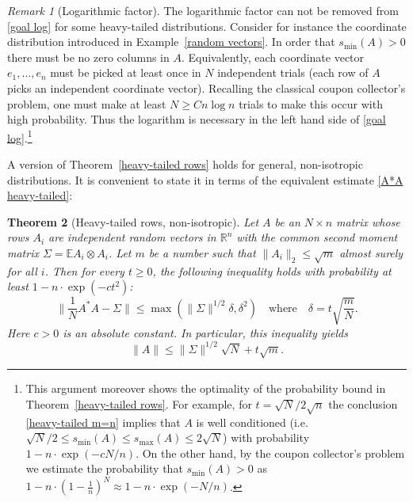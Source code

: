 \documentclass[10pt, openany]{book}
\newtheorem{theorem}{Theorem}[chapter]
\theoremstyle{remark}
\newtheorem{remark}[theorem]{Remark}
\def \R {\mathbb{R}}
\def \E {\mathbb{E}}
\def \d {\delta}
\def \smin {s_{\min}}
\def \smax {s_{\max}}
\begin{document}
\begin{remark}[Logarithmic factor] 
  The logarithmic factor can not be removed from \eqref{goal log} for some heavy-tailed distributions.
  Consider for instance the coordinate distribution introduced in Example~\ref{random vectors}. 
  In order that $\smin(A) > 0$ there must be no zero columns in $A$. Equivalently, each coordinate vector
  $e_1, \ldots,e_n$  must be picked at least once in $N$ independent trials 
  (each row of $A$ picks an independent coordinate vector). 
  Recalling the classical coupon collector's problem, one must make at least $N \ge C n \log n$ trials to make this occur
  with high probability. Thus the logarithm is necessary in the left hand side of \eqref{goal log}.\footnote{This argument 
  moreover shows the optimality of the probability bound in Theorem~\ref{heavy-tailed rows}.
  For example, for $t = \sqrt{N}/2\sqrt{n}$ the conclusion \eqref{heavy-tailed m=n} implies 
  that $A$ is well conditioned (i.e. $\sqrt{N}/2 \le \smin(A) \le \smax(A) \le 2 \sqrt{N}$) 
  with probability $1 - n \cdot \exp(-cN/n)$. 
  On the other hand, by the coupon collector's problem we estimate the probability that $\smin(A) > 0$ as
  $1 - n \cdot (1- \frac{1}{n})^N \approx 1 - n \cdot \exp(-N/n)$.}
\end{remark}


A version of Theorem~\ref{heavy-tailed rows} holds for general, non-isotropic distributions.
It is convenient to state it in terms of the equivalent estimate \eqref{A*A heavy-tailed}:

\begin{theorem}[Heavy-tailed rows, non-isotropic]					\label{heavy-tailed rows non-isotropic}
  Let $A$ be an $N \times n$ matrix whose rows $A_i$ are independent
  random vectors in $\R^n$ with the common second moment matrix $\Sigma = \E A_i \otimes A_i$. 
  Let $m$ be a number such that $\|A_i\|_2 \le \sqrt{m}$ almost surely for all $i$. 
  Then for every $t \ge 0$, the following inequality holds with probability at least $1 - n \cdot \exp(-ct^2)$:
  \begin{equation}							\label{A*A heavy-tailed rows non-isotropic}
  \big\| \frac{1}{N}A^*A-\Sigma \big\| \le \max(\|\Sigma\|^{1/2}\d, \d^2)
  \quad \text{where} \quad
  \d = t \sqrt{\frac{m}{N}}.
  \end{equation}
  Here $c>0$ is an absolute constant.
  In particular, this inequality yields
  \begin{equation}							\label{A heavy-tailed rows non-isotropic}
  \|A\| \le \|\Sigma\|^{1/2} \sqrt{N} + t \sqrt{m}.
  \end{equation}
\end{theorem}
\end{document}

